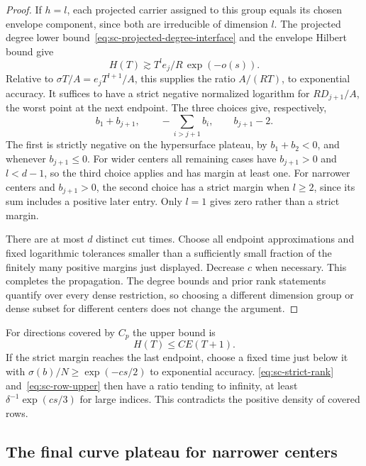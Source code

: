 \begin{proof}
If $h=l$, each projected carrier assigned to this group equals its chosen envelope component, since both are irreducible of dimension $l$. The projected degree lower bound~\eqref{eq:sc-projected-degree-interface} and the envelope Hilbert bound give
\[
 H(T)\gtrsim T^l e_j/R\,\exp(-o(s)).
\]
Relative to $\sigma T/A=e_jT^{l+1}/A$, this supplies the ratio $A/(RT)$, to exponential accuracy.  It suffices to have a strict negative normalized logarithm for $R D_{j+1}/A$, the worst point at the next endpoint. The three choices give, respectively,
\begin{equation}\label{eq:sc-strict-margins}
 b_1+b_{j+1},\qquad
 -\sum_{i>j+1}b_i,\qquad
 b_{j+1}-2.
\end{equation}
The first is strictly negative on the hypersurface plateau, by $b_1+b_2<0$, and whenever $b_{j+1}\le0$. For wider centers all remaining cases have $b_{j+1}>0$ and $l<d-1$, so the third choice applies and has margin at least one.  For narrower centers and $b_{j+1}>0$, the second choice has a strict margin when $l\ge2$, since its sum includes a positive later entry. Only $l=1$ gives zero rather than a strict margin.

There are at most $d$ distinct cut times.  Choose all endpoint approximations and fixed logarithmic tolerances smaller than a sufficiently small fraction of the finitely many positive margins just displayed.  Decrease $c$ when necessary.  This completes the propagation. The degree bounds and prior rank statements quantify over every dense restriction, so choosing a different dimension group or dense subset for different centers does not change the argument.
\end{proof}

For directions covered by $C_p$ the upper bound is
\begin{equation}\label{eq:sc-row-upper}
 H(T)\le CE(T+1).
\end{equation}
If the strict margin reaches the last endpoint, choose a fixed time just below it with $\sigma(b)/N\ge\exp(-c s/2)$ to exponential accuracy.  \eqref{eq:sc-strict-rank} and~\eqref{eq:sc-row-upper} then have a ratio tending to infinity, at least $\delta^{-1}\exp(c s/3)$ for large indices.  This contradicts the positive density of covered rows.

\subsection{The final curve plateau for narrower centers}

